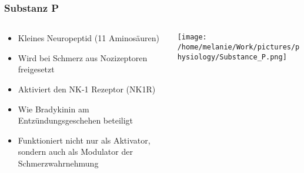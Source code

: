 \documentclass{beamer}
\begin{document}
\begin{frame}
\frametitle{Substanz P}

\begin{columns}[c]
\begin{column}{5cm}
\begin{itemize}
\item
Kleines Neuropeptid (11 Aminosäuren)
\item
Wird bei Schmerz aus Nozizeptoren freigesetzt
\item
Aktiviert den NK-1 Rezeptor (NK1R)
\item
Wie Bradykinin am Entzündungsgeschehen beteiligt 
\item 
Funktioniert nicht nur als Aktivator, sondern auch als \textcolor{theme}{Modulator} der Schmerzwahrnehmung
\end{itemize}

\end{column}

\begin{column}{5cm}
\begin{center}
\texttt{[image: /home/melanie/Work/pictures/physiology/Substance\_P.png]}
\end{center}
\end{column}
\end{columns}


\end{frame}


\end{document}

